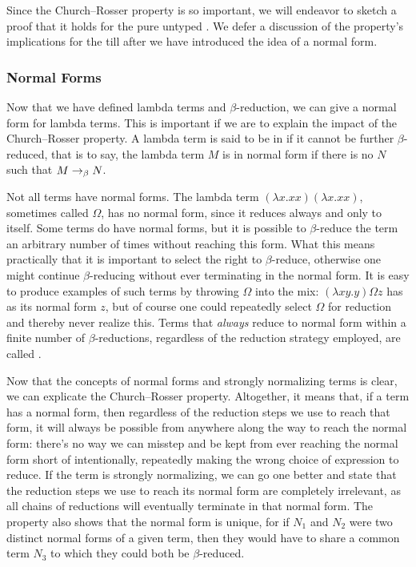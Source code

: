 Since the Church--Rosser property is so important, we will endeavor to sketch a proof that it holds for the pure untyped \lambdacalc{}. We defer a discussion of the property's implications for the \lambdacalc till after we have introduced the idea of a normal form.%

\subsubsection{Normal Forms}\label{untyped:nf}
Now that we have defined lambda terms and $\beta$-reduction, we can give a normal form for lambda terms. This is important if we are to explain the impact of the Church--Rosser property. A lambda term is said to be in  if it cannot be further $\beta$-reduced, that is to say, the lambda term $M$ is in normal form if there is no $N$ such that $M \betared N$.

Not all terms have normal forms. The lambda term $(\lambda x.xx)(\lambda x.xx)$, sometimes called $\Omega$, has no normal form, since it reduces always and only to itself. Some terms do have normal forms, but it is possible to $\beta$-reduce the term an arbitrary number of times without reaching this form. What this means practically that it is important to select the right  to $\beta$-reduce, otherwise one might continue $\beta$-reducing without ever terminating in the normal form. It is easy to produce examples of such terms by throwing $\Omega$ into the mix: $(\lambda xy.y) \Omega z$ has as its normal form $z$, but of course one could repeatedly select $\Omega$ for reduction and thereby never realize this. Terms that \emph{always} reduce to normal form within a finite number of $\beta$-reductions, regardless of the reduction strategy employed, are called .

Now that the concepts of normal forms and strongly normalizing terms is clear, we can explicate the Church--Rosser property. Altogether, it means that, if a term has a normal form, then regardless of the reduction steps we use to reach that form, it will always be possible from anywhere along the way to reach the normal form: there's no way we can misstep and be kept from ever reaching the normal form short of intentionally, repeatedly making the wrong choice of expression to reduce. If the term is strongly normalizing, we can go one better and state that the reduction steps we use to reach its normal form are completely irrelevant, as all chains of reductions will eventually terminate in that normal form. The property also shows that the normal form is unique, for if $N_{1}$ and $N_{2}$ were two distinct normal forms of a given term, then they would have to share a common term $N_{3}$ to which they could both be $\beta$-reduced.

